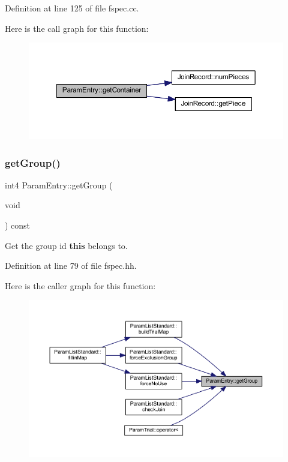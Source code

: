 Definition at line 125 of file fspec.\+cc.

Here is the call graph for this function\+:
\nopagebreak
\begin{figure}[H]
\begin{center}
\leavevmode
\includegraphics[width=350pt]{class_param_entry_a8725ae536c3a2eb5747df143eee4a552_cgraph}
\end{center}
\end{figure}
\mbox{\label{class_param_entry_a8bc3366591bc6e9a39cfa851052dc684}} 
\subsubsection{\texorpdfstring{getGroup()}{getGroup()}}
{\footnotesize\ttfamily int4 Param\+Entry\+::get\+Group (\begin{DoxyParamCaption}\item[{void}]{ }\end{DoxyParamCaption}) const\hspace{0.3cm}{\ttfamily [inline]}}



Get the group id {\bfseries{this}} belongs to. 



Definition at line 79 of file fspec.\+hh.

Here is the caller graph for this function\+:
\nopagebreak
\begin{figure}[H]
\begin{center}
\leavevmode
\includegraphics[width=350pt]{class_param_entry_a8bc3366591bc6e9a39cfa851052dc684_icgraph}
\end{center}
\end{figure}
\mbox{\label{class_param_entry_aa260212ed69b0efb8fc52aba0930ab11}} 
